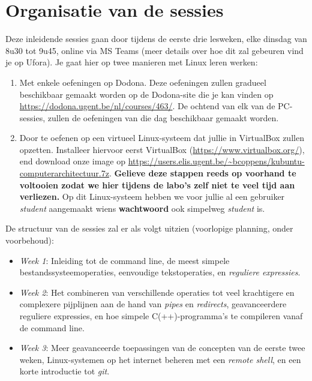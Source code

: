 \documentclass[a4paper,twoside,openany]{memoir}
\begin{document}
\section{Organisatie van de sessies}


Deze inleidende sessies gaan door tijdens de eerste drie lesweken, elke dinsdag
van 8u30 tot 9u45, online via MS Teams (meer details over hoe dit zal
gebeuren vind je op Ufora). Je gaat hier op twee manieren met Linux leren werken:

\begin{enumerate}

  \item Met enkele oefeningen op Dodona. Deze oefeningen zullen gradueel
    beschikbaar gemaakt worden op de Dodona-site die je kan vinden op
    \url{https://dodona.ugent.be/nl/courses/463/}. De ochtend van elk van de PC-sessies,
    zullen de oefeningen van die dag beschikbaar gemaakt worden.

  \item Door te oefenen op een virtueel Linux-systeem dat jullie in VirtualBox
    zullen opzetten. Installeer hiervoor eerst VirtualBox
    (\url{https://www.virtualbox.org/}), end download onze image op
    \url{https://users.elis.ugent.be/~bcoppens/kubuntu-computerarchitectuur.7z}.
    \textbf{Gelieve deze stappen reeds op voorhand te voltooien zodat we hier
    tijdens de labo's zelf niet te veel tijd aan verliezen.}
    Op dit Linux-systeem hebben we voor jullie al
    een gebruiker \emph{student} aangemaakt wiens \textbf{wachtwoord} ook
    simpelweg \emph{student} is.

\end{enumerate}

De structuur van de sessies zal er als volgt uitzien (voorlopige planning, onder voorbehoud):

\begin{itemize}

  \item \emph{Week 1}: Inleiding tot de command line, de meest simpele
    bestandssysteemoperaties, eenvoudige tekstoperaties, en \emph{reguliere
    expressies}.

  \item \emph{Week 2}: Het combineren van verschillende operaties tot veel
    krachtigere en complexere pijplijnen aan de hand van \emph{pipes} en
    \emph{redirects}, geavanceerdere reguliere expressies, en hoe simpele
    C(++)-programma's te compileren vanaf de command line.

  \item \emph{Week 3}: Meer geavanceerde toepassingen van de concepten van de
    eerste twee weken, Linux-systemen op het internet beheren met een
    \emph{remote shell}, en een korte introductie tot \emph{git}.

\end{itemize}
\end{document}
